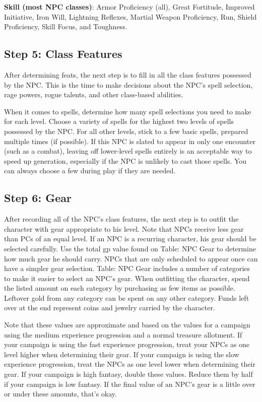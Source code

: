\textbf{Skill (most NPC classes)}: Armor Proficiency (all), Great Fortitude, Improved Initiative, Iron Will, Lightning Reflexes, Martial Weapon Proficiency, Run, Shield Proficiency, Skill Focus, and Toughness.
				
\subsection{Step 5: Class Features}

				
After determining feats, the next step is to fill in all the class features possessed by the NPC. This is the time to make decisions about the NPC's spell selection, rage powers, rogue talents, and other class-based abilities. 
				
When it comes to spells, determine how many spell selections you need to make for each level. Choose a variety of spells for the highest two levels of spells possessed by the NPC. For all other levels, stick to a few basic spells, prepared multiple times (if possible). If this NPC is slated to appear in only one encounter (such as a combat), leaving off lower-level spells entirely is an acceptable way to speed up generation, especially if the NPC is unlikely to cast those spells. You can always choose a few during play if they are needed.
				
\subsection{Step 6: Gear}

				
After recording all of the NPC's class features, the next step is to outfit the character with gear appropriate to his level. Note that NPCs receive less gear than PCs of an equal level. If an NPC is a recurring character, his gear should be selected carefully. Use the total gp value found on Table: NPC Gear to determine how much gear he should carry. NPCs that are only scheduled to appear once can have a simpler gear selection. Table: NPC Gear includes a number of categories to make it easier to select an NPC's gear. When outfitting the character, spend the listed amount on each category by purchasing as few items as possible. Leftover gold from any category can be spent on any other category. Funds left over at the end represent coins and jewelry carried by the character.
				
Note that these values are approximate and based on the values for a campaign using the medium experience progression and a normal treasure allotment. If your campaign is using the fast experience progression, treat your NPCs as one level higher when determining their gear. If your campaign is using the slow experience progression, treat the NPCs as one level lower when determining their gear. If your campaign is high fantasy, double these values. Reduce them by half if your campaign is low fantasy. If the final value of an NPC's gear is a little over or under these amounts, that's okay.

